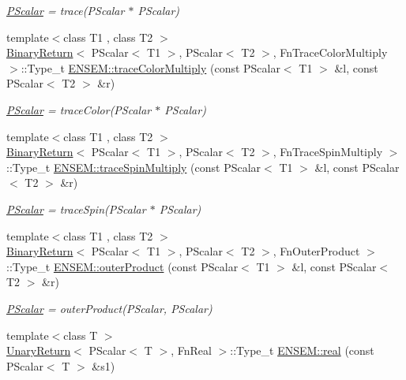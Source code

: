 \begin{DoxyCompactItemize}
\begin{DoxyCompactList}\small\item\em \mbox{\hyperlink{classENSEM_1_1PScalar}{P\+Scalar}} = trace(\+P\+Scalar $\ast$ P\+Scalar) \end{DoxyCompactList}\item 
{\footnotesize template$<$class T1 , class T2 $>$ }\\\mbox{\hyperlink{structBinaryReturn}{Binary\+Return}}$<$ P\+Scalar$<$ T1 $>$, P\+Scalar$<$ T2 $>$, Fn\+Trace\+Color\+Multiply $>$\+::Type\+\_\+t \mbox{\hyperlink{group__primscalar_ga7d0ad8d52e28a6e277de161b427932eb}{E\+N\+S\+E\+M\+::trace\+Color\+Multiply}} (const P\+Scalar$<$ T1 $>$ \&l, const P\+Scalar$<$ T2 $>$ \&r)
\begin{DoxyCompactList}\small\item\em \mbox{\hyperlink{classENSEM_1_1PScalar}{P\+Scalar}} = trace\+Color(\+P\+Scalar $\ast$ P\+Scalar) \end{DoxyCompactList}\item 
{\footnotesize template$<$class T1 , class T2 $>$ }\\\mbox{\hyperlink{structBinaryReturn}{Binary\+Return}}$<$ P\+Scalar$<$ T1 $>$, P\+Scalar$<$ T2 $>$, Fn\+Trace\+Spin\+Multiply $>$\+::Type\+\_\+t \mbox{\hyperlink{group__primscalar_gadf055daaaacb2711107a9c9dbba9a129}{E\+N\+S\+E\+M\+::trace\+Spin\+Multiply}} (const P\+Scalar$<$ T1 $>$ \&l, const P\+Scalar$<$ T2 $>$ \&r)
\begin{DoxyCompactList}\small\item\em \mbox{\hyperlink{classENSEM_1_1PScalar}{P\+Scalar}} = trace\+Spin(\+P\+Scalar $\ast$ P\+Scalar) \end{DoxyCompactList}\item 
{\footnotesize template$<$class T1 , class T2 $>$ }\\\mbox{\hyperlink{structBinaryReturn}{Binary\+Return}}$<$ P\+Scalar$<$ T1 $>$, P\+Scalar$<$ T2 $>$, Fn\+Outer\+Product $>$\+::Type\+\_\+t \mbox{\hyperlink{group__primscalar_gaa87ddc7f8a5ec9fc1cb807c54d727128}{E\+N\+S\+E\+M\+::outer\+Product}} (const P\+Scalar$<$ T1 $>$ \&l, const P\+Scalar$<$ T2 $>$ \&r)
\begin{DoxyCompactList}\small\item\em \mbox{\hyperlink{classENSEM_1_1PScalar}{P\+Scalar}} = outer\+Product(\+P\+Scalar, P\+Scalar) \end{DoxyCompactList}\item 
{\footnotesize template$<$class T $>$ }\\\mbox{\hyperlink{structUnaryReturn}{Unary\+Return}}$<$ P\+Scalar$<$ T $>$, Fn\+Real $>$\+::Type\+\_\+t \mbox{\hyperlink{group__primscalar_gac01f1564e4c432779ff00f12778275cf}{E\+N\+S\+E\+M\+::real}} (const P\+Scalar$<$ T $>$ \&s1)

\end{DoxyCompactItemize}
